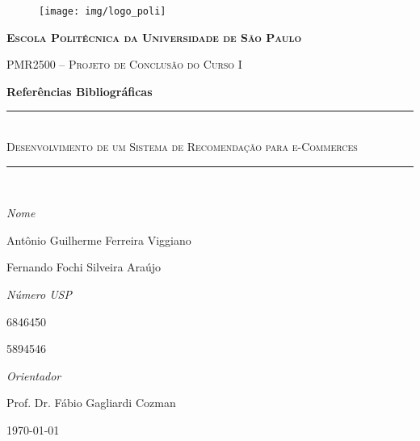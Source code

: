 \begin{center}
\begin{figure}[ht]
    \begin{center}
    \texttt{[image: img/logo\_poli]}
    \end{center}
    \label{logo_poli}
\end{figure}
\end{center}

\begin{center}
\textbf{\textsc{Escola Politécnica da Universidade de São Paulo}}

\textsc{PMR2500 -- Projeto de Conclusão do Curso I}

\textbf{\Large Referências Bibliográficas}
\end{center}
\begin{center}
\vspace{2cm}
\hrule  ~\\[0.5cm]
{ \huge \textsc{Desenvolvimento de um Sistema de Recomendação para e-Commerces}}\\[0.8cm]

\hrule  ~\\[0.5cm]

\end{center}


\vfill

\begin{minipage}{0.65\textwidth} 
	\large\emph{Nome} 
	
	\large{Antônio Guilherme Ferreira Viggiano}
		
	\large{Fernando Fochi Silveira Araújo}  

\end{minipage}
\begin{minipage}{0.35\textwidth} 
	\large\emph{Número USP}
	
	6846450
	
	5894546
\end{minipage}

\vfill

\begin{center}
	\large\emph{Orientador}

	\large{Prof. Dr. Fábio Gagliardi Cozman}
\end{center}

\vfill

\begin{center}
	\today
\end{center}
